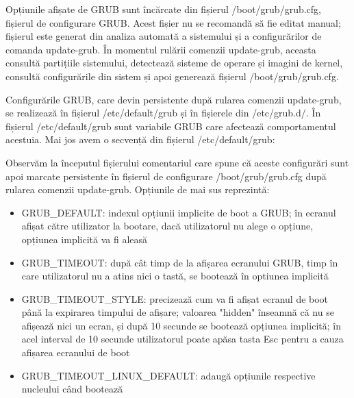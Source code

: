 Opțiunile afișate de GRUB sunt încărcate din fișierul /boot/grub/grub.cfg,
fișierul de configurare GRUB. Acest fișier nu se recomandă să fie editat manual;
fișierul este generat din analiza automată a sistemului și a configurărilor de
comanda update-grub. În momentul rulării comenzii update-grub, aceasta consultă
partițiile sistemului, detectează sisteme de operare și imagini de kernel,
consultă configurările din sistem și apoi generează fișierul
/boot/grub/grub.cfg.

Configurările GRUB, care devin persistente după rularea comenzii update-grub, se
realizează în fișierul /etc/default/grub și în fișierele din /etc/grub.d/. În
fișierul /etc/default/grub sunt variabile GRUB care afectează comportamentul
acestuia. Mai jos avem o secvență din fișierul /etc/default/grub:


Observăm la începutul fișierului comentariul care spune că aceste configurări
sunt apoi marcate persistente în fișierul de configurare /boot/grub/grub.cfg
după rularea comenzii update-grub. Opțiunile de mai sus reprezintă:

\begin{itemize}
	\item GRUB_DEFAULT: indexul opțiunii implicite de boot a GRUB; în
		ecranul afișat către utilizator la bootare, dacă utilizatorul nu
		alege o opțiune, opțiunea implicită va fi aleasă
	\item GRUB_TIMEOUT: după cât timp de la afișarea ecranului GRUB, timp în
		care utilizatorul nu a atins nici o tastă, se bootează în
		optiunea implicită
	\item GRUB_TIMEOUT_STYLE: precizează cum va fi afișat ecranul de boot
		până la expirarea timpului de afișare; valoarea "hidden"
		înseamnă că nu se afișează nici un ecran, și după 10 secunde se
		bootează opțiunea implicită; în acel interval de 10 secunde
		utilizatorul poate apăsa tasta Esc pentru a cauza afișarea
		ecranului de boot
	\item GRUB_TIMEOUT_LINUX_DEFAULT: adaugă opțiunile respective nucleului
		când bootează
\end{itemize}

